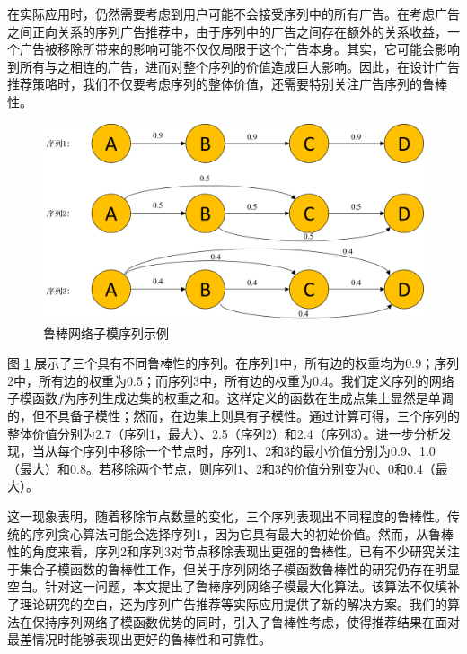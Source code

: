 在实际应用时，仍然需要考虑到用户可能不会接受序列中的所有广告。在考虑广告之间正向关系的序列广告推荐中，由于序列中的广告之间存在额外的关系收益，一个广告被移除所带来的影响可能不仅仅局限于这个广告本身。其实，它可能会影响到所有与之相连的广告，进而对整个序列的价值造成巨大影响。因此，在设计广告推荐策略时，我们不仅要考虑序列的整体价值，还需要特别关注广告序列的鲁棒性。

\begin{figure}[th]
    \centering
    \includegraphics[width=.89\linewidth]{figure/rosenets/sample1}
    \caption{鲁棒网络子模序列示例}
    \label{fig:robust_sample}
\end{figure}

图 \ref{fig:robust_sample} 展示了三个具有不同鲁棒性的序列。在序列1中，所有边的权重均为0.9；序列2中，所有边的权重为0.5；而序列3中，所有边的权重为0.4。我们定义序列的网络子模函数$f$为序列生成边集的权重之和。这样定义的函数在生成点集上显然是单调的，但不具备子模性；然而，在边集上则具有子模性。通过计算可得，三个序列的整体价值分别为2.7（序列1，最大）、2.5（序列2）和2.4（序列3）。进一步分析发现，当从每个序列中移除一个节点时，序列1、2和3的最小价值分别为0.9、1.0（最大）和0.8。若移除两个节点，则序列1、2和3的价值分别变为0、0和0.4（最大）。

这一现象表明，随着移除节点数量的变化，三个序列表现出不同程度的鲁棒性。传统的序列贪心算法\cite{tschiatschek2017selecting,mitrovic2018submodularity}可能会选择序列1，因为它具有最大的初始价值。然而，从鲁棒性的角度来看，序列2和序列3对节点移除表现出更强的鲁棒性。已有不少研究关注于集合子模函数的鲁棒性工作\cite{orlin2018robust,bogunovic2017robust,mitrovic2017streaming,tzoumas2017resilient}，但关于序列网络子模函数鲁棒性的研究仍存在明显空白。针对这一问题，本文提出了鲁棒序列网络子模最大化算法。该算法不仅填补了理论研究的空白，还为序列广告推荐等实际应用提供了新的解决方案。我们的算法在保持序列网络子模函数优势的同时，引入了鲁棒性考虑，使得推荐结果在面对最差情况时能够表现出更好的鲁棒性和可靠性。

